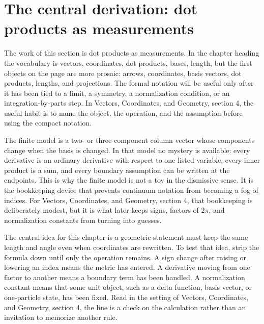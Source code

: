 \section{The central derivation: dot products as measurements}













The work of this section is dot products as measurements.  In the chapter heading the vocabulary is vectors, coordinates, dot products, bases, length, but the first objects on the page are more prosaic: arrows, coordinates, basis vectors, dot products, lengths, and projections.  The formal notation will be useful only after it has been tied to a limit, a symmetry, a normalization condition, or an integration-by-parts step.  In Vectors, Coordinates, and Geometry, section 4, the useful habit is to name the object, the operation, and the assumption before using the compact notation.

The finite model is a two- or three-component column vector whose components change when the basis is changed.  In that model no mystery is available: every derivative is an ordinary derivative with respect to one listed variable, every inner product is a sum, and every boundary assumption can be written at the endpoints.  This is why the finite model is not a toy in the dismissive sense.  It is the bookkeeping device that prevents continuum notation from becoming a fog of indices.  For Vectors, Coordinates, and Geometry, section 4, that bookkeeping is deliberately modest, but it is what later keeps signs, factors of \(2\pi\), and normalization constants from turning into guesses.

The central idea for this chapter is a geometric statement must keep the same length and angle even when coordinates are rewritten.  To test that idea, strip the formula down until only the operation remains.  A sign change after raising or lowering an index means the metric has entered.  A derivative moving from one factor to another means a boundary term has been handled.  A normalization constant means that some unit object, such as a delta function, basis vector, or one-particle state, has been fixed.  Read in the setting of Vectors, Coordinates, and Geometry, section 4, the line is a check on the calculation rather than an invitation to memorize another rule.

